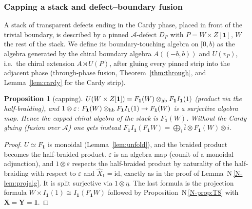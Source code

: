 \documentclass[11pt]{article}
\newtheorem{proposition}[theorem]{Proposition}
\theoremstyle{definition}
\theoremstyle{remark}
\newcommand{\cA}{\mathcal A}
\newcommand{\nref}[1]{N\,\ref{N-#1}}
\begin{document}
\subsubsection*{Capping a stack and defect--boundary fusion}
A stack of transparent defects ending in the Cardy phase, placed in front of the trivial boundary, is described by a pinned $\cA$-defect $D_P$ with $P=W\times Z[\mathbf 1]$, $W$ the rest of the stack. We define its boundary-touching algebra on $[0,b)$ as the algebra generated by the chiral boundary algebra $A((-b,b))$ and $U(v_P)$, i.e.\ the chiral extension $A\rtimes U(P)$, after gluing every pinned strip into the adjacent phase (through-phase fusion, Theorem~\ref{thm:through}, and Lemma~\ref{lem:cardy} for the Cardy strip).

\begin{proposition}[capping]\label{prop:cap}
$U(W\times Z[\mathbf 1])=F_{\mathbf 1}(W)\otimes_{\rm hb}F_{\mathbf 1}I_{\mathbf 1}(1)$ (product via the half-braiding), and $1\otimes\varepsilon\colon F_{\mathbf 1}(W)\otimes_{\rm hb}F_{\mathbf 1}I_{\mathbf 1}(1)\to F_{\mathbf 1}(W)$ is a surjective algebra map. Hence the capped chiral algebra of the stack is $F_{\mathbf 1}(W)$. Without the Cardy gluing (fusion over $\cA$) one gets instead $F_{\mathbf 1}I_{\mathbf 1}(F_{\mathbf 1}W)=\bigoplus_{i}\bar i\otimes F_{\mathbf 1}(W)\otimes i$.
\end{proposition}
\begin{proof}
$U\simeq F_{\mathbf 1}$ is monoidal (Lemma~\ref{lem:unfold}), and the braided product becomes the half-braided product. $\varepsilon$ is an algebra map (counit of a monoidal adjunction), and $1\otimes\varepsilon$ respects the half-braided product by naturality of the half-braiding with respect to $\varepsilon$ and $\widehat X_1=\mathrm{id}$, exactly as in the proof of Lemma~\nref{lem:projalg}. It is split surjective via $1\otimes\eta$. The last formula is the projection formula $W\times I_{\mathbf 1}(1)\cong I_{\mathbf 1}(F_{\mathbf 1}W)$ followed by Proposition~\nref{prop:T8} with $\mathbf X=\mathbf Y=\mathbf 1$.
\end{proof}
\end{document}
